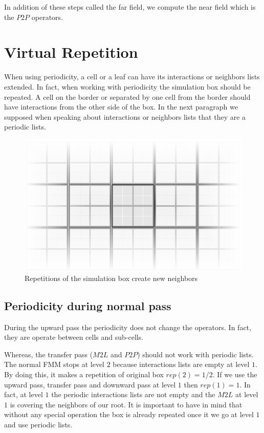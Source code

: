 \documentclass[12pt]{article} %
\begin{document}
In addition of these steps called the far field, we compute the near field which is the $P2P$ operators.


\section{Virtual Repetition}

When using periodicity, a cell or a leaf can have its interactions or neighbors lists extended.
In fact, when working with periodicity the simulation box should be repeated.
A cell on the border or separated by one cell from the border should have interactions from the other side of the box.
In the next paragraph we supposed when speaking about interactions or neighbors lists that they are a periodic lists.

\begin{figure}[h]
\centering
\includegraphics[scale=0.6]{../Images/Repetitions}
\caption{Repetitions of the simulation box create new neighbors}
\end{figure}

\subsection{Periodicity during normal pass}
During the upward pass the periodicity does not change the operators.
In fact, they are operate between cells and sub-cells.

Whereas, the transfer pass ($M2L$ and $P2P$) should not work with periodic lists.
The normal FMM stops at level $2$ because interactions lists are empty at level $1$.
By doing this, it makes a repetition of original box $rep(2) = 1/2$.
If we use the upward pass, transfer pass and downward pass at level $1$ then $rep(1) = 1$.
In fact, at level $1$ the periodic interactions lists are not empty and the $M2L$ at level $1$ is covering the neighbors of our root.
It is important to have in mind that without any special operation the box is already repeated once it we go at level $1$ and use periodic lists.
\end{document}
